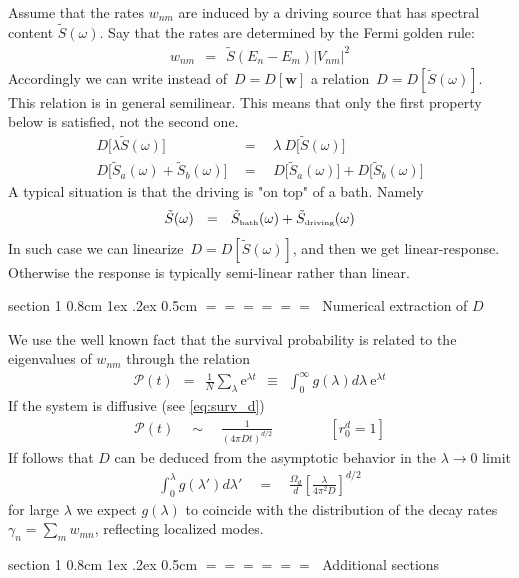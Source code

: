 \documentclass[onecolumn,fleqn,notitlepage,secnumarabic]{revtex4}
\makeatletter
\newcommand{\eexp}{\mbox{e}^}
\newcommand{\tbox}[1]{\mbox{\tiny #1}}
\newcommand{\beq}{\begin{eqnarray}}
\newcommand{\eeq}{\end{eqnarray}}
\def\section{%
  \@startsection
    {section}%
    {1}%
    {\z@}%
    {0.8cm \@plus1ex \@minus .2ex}%
    {0.5cm}%
    {\Large\bf $=\!=\!=\!=\!=\!=\;$}%
}%
\makeatother
\begin{document}
Assume that the rates $w_{nm}$ are induced 
by a driving source that has spectral content $\tilde{S}(\omega)$. 
Say that the rates are determined by the Fermi golden rule:
%
\beq
w_{nm} \ \ = \ \ \tilde{S}(E_n-E_m) |V_{nm}|^2
\eeq
%
Accordingly we can write instead of~$D=D[\bm{w}]$ a relation~$D=D[\tilde{S}(\omega)]$.
This relation is in general semilinear. This means that only the first property below 
is satisfied, not the second one.
%
\beq
D\big[ \lambda \tilde{S}(\omega)\big]  \ \ &=& \ \  \lambda \ D\big[\tilde{S}(\omega)\big] 
\\
D\big[\tilde{S}_a(\omega) + \tilde{S}_b(\omega)\big]  \ \ &=& \ \  D\big[\tilde{S}_a(\omega)\big] + D\big[\tilde{S}_b(\omega)\big]
\eeq
%
A typical situation is that the driving is "on top" of a bath. Namely 
%
\beq
\tilde{S}(\omega) \ \ = \ \ \tilde{S}_{\tbox{bath}}(\omega) + \tilde{S}_{\tbox{driving}}(\omega)
\eeq  
%
In such case we can linearize~$D=D[\tilde{S}(\omega)]$, and then we get 
linear-response. Otherwise the response is typically semi-linear rather than linear. 



\section{Numerical extraction of $D$}


We use the well known fact that the survival probability 
is related to the eigenvalues of $w_{nm}$ through the relation
%
\beq
\mathcal{P}(t) \ \ = \ \ \frac{1}{N}\sum_\lambda \eexp{\lambda t} \ \ \equiv \ \ \int_0^{\infty} g(\lambda)d\lambda \ \eexp{\lambda t}
\eeq
%
If the system is diffusive (see \eqref{eq:surv_d})
%
\beq
  \mathcal{P}(t) \quad \sim \quad  \frac{1}{\left({4\pi D t}\right)^{d/2}} 
  \qquad\qquad[r_0^d=1]
\eeq
%
If follows that $D$ can be deduced from 
the asymptotic behavior in the ${\lambda\rightarrow 0}$ limit  
%
\beq
\int_0^\lambda g(\lambda')d\lambda' \quad = \quad \frac{\Omega_d}{d}\left[\frac{\lambda}{4\pi^2 D}\right]^{d/2}
\eeq
%
for large $\lambda$ we expect $g(\lambda)$ to coincide 
with the distribution of the decay rates $\gamma_n=\sum_{m}w_{mn}$, 
reflecting localized modes.



\section{Additional sections}
\end{document}
